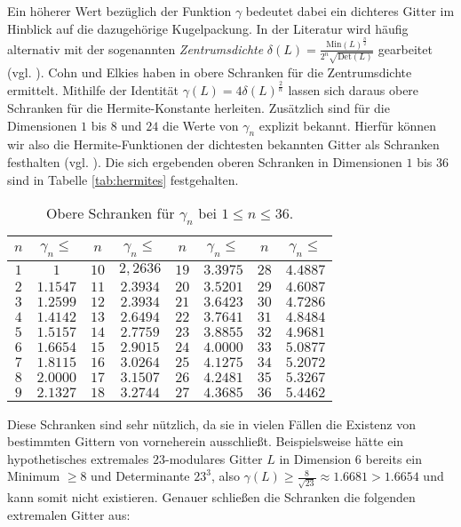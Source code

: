 \documentclass[12pt,a4paper,halfparskip,headsepline,bibtotocnumbered]{scrreprt}
\theoremstyle{nummermitklammern}
\theoremstyle{nonumberbreak}
\newcommand{\Det}{\text{Det}}
\newcommand{\Min}{\text{Min}}
\begin{document}
Ein höherer Wert bezüglich der Funktion $\gamma$ bedeutet dabei ein dichteres Gitter im Hinblick auf die dazugehörige Kugelpackung. In der Literatur wird häufig alternativ mit der sogenannten \textit{Zentrumsdichte} $\delta(L) = \frac{\Min(L)^{\frac{n}{2}}}{2^n \sqrt{\Det(L)}}$ gearbeitet (vgl. \cite[(1.5)]{conway}). Cohn und Elkies haben in \cite{cohn} obere Schranken für die Zentrumsdichte ermittelt. Mithilfe der Identität $\gamma(L) = 4 \delta(L)^\frac{2}{n}$ lassen sich daraus obere Schranken für die Hermite-Konstante herleiten. Zusätzlich sind für die Dimensionen $1$ bis $8$ und $24$ die Werte von $\gamma_n$ explizit bekannt. Hierfür können wir also die Hermite-Funktionen der dichtesten bekannten Gitter als Schranken festhalten (vgl. \cite{database}). Die sich ergebenden oberen Schranken in Dimensionen $1$ bis $36$ sind in Tabelle \eqref{tab:hermites} festgehalten.

\begin{table}[H]\label{tab:hermites}
\centering
	\begin{tabular}{|c|c||c|c||c|c||c|c|}
		\hline
		$n$		&$\gamma_n\leq$		&$n$	&$\gamma_n\leq$		&$n$	&$\gamma_n\leq$		&$n$	&$\gamma_n\leq$ \\ \hline
		$1$		&$1$				&$10$	&$2,2636$			&$19$	&$3.3975$			&$28$	&$4.4887$ \\ \hline
		$2$		&$1.1547$			&$11$	&$2.3934$			&$20$	&$3.5201$			&$29$	&$4.6087$ \\ \hline
		$3$		&$1.2599$			&$12$	&$2.3934$			&$21$	&$3.6423$			&$30$	&$4.7286$ \\ \hline
		$4$		&$1.4142$			&$13$	&$2.6494$			&$22$	&$3.7641$			&$31$	&$4.8484$ \\ \hline
		$5$		&$1.5157$			&$14$	&$2.7759$			&$23$	&$3.8855$			&$32$	&$4.9681$ \\ \hline
		$6$		&$1.6654$			&$15$	&$2.9015$			&$24$	&$4.0000$			&$33$	&$5.0877$ \\ \hline
		$7$		&$1.8115$			&$16$	&$3.0264$			&$25$	&$4.1275$			&$34$	&$5.2072$ \\ \hline
		$8$		&$2.0000$			&$17$	&$3.1507$			&$26$	&$4.2481$			&$35$	&$5.3267$ \\ \hline
		$9$		&$2.1327$			&$18$	&$3.2744$			&$27$	&$4.3685$			&$36$	&$5.4462$ \\
		\hline
	\end{tabular}
	\caption{Obere Schranken für $\gamma_n$ bei $1 \leq n \leq 36$.}
\end{table}

Diese Schranken sind sehr nützlich, da sie in vielen Fällen die Existenz von bestimmten Gittern von vorneherein ausschließt. Beispielsweise hätte ein hypothetisches extremales $23$-modulares Gitter $L$ in Dimension $6$ bereits ein Minimum $\geq 8$ und Determinante $23^3$, also $\gamma(L) \geq \frac{8}{\sqrt{23}} \approx 1.6681 > 1.6654$ und kann somit nicht existieren. Genauer schließen die Schranken die folgenden extremalen Gitter aus:
\end{document}
